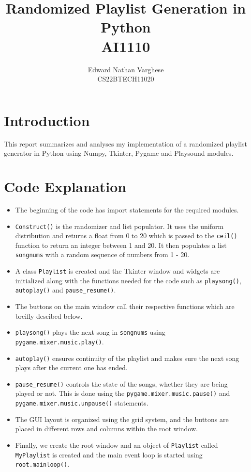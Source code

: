 \documentclass[journal,12pt,twocolumn]{IEEEtran}
\begin{document}
\vspace{3cm}

\title{Randomized Playlist Generation in Python \\ AI1110}
\author{Edward Nathan Varghese \\ CS22BTECH11020}


\maketitle

\section{Introduction}
This report summarizes and analyses my implementation of a randomized playlist generator in Python using Numpy, Tkinter, Pygame and Playsound modules.

\section{Code Explanation}
\begin{itemize}
  \item The beginning of the code has import statements for the required modules.
  \item \texttt{Construct()} is the randomizer and list populator. It uses the uniform distribution and returns a float from 0 to 20 which is passed to the \texttt{ceil()} function to return an integer between 1 and 20. It then populates a list \texttt{songnums} with a random sequence of numbers from 1 - 20.
  \item A class \texttt{Playlist} is created and the Tkinter window and widgets are initialized along with the functions needed for the code  such as \texttt{playsong()}, \texttt{autoplay()} and \texttt{pause\_resume()}.
  \item The buttons on the main window call their respective functions which are breifly descibed below.
  \item \texttt{playsong()} plays the next song in \texttt{songnums} using \texttt{pygame.mixer.music.play()}.
  \item \texttt{autoplay()} ensures continuity of the playlist and makes sure the next song plays after the current one has ended.
  \item \texttt{pause\_resume()} controls the state of the songs, whether they are being played or not. This is done using the \texttt{pygame.mixer.music.pause()} and \texttt{pygame.mixer.music.unpause()} statements.
  \item The GUI layout is organized using the grid system, and the buttons are placed in different rows and columns within the root window.
  \item Finally, we create the root window and an object of \texttt{Playlist} called \texttt{MyPlaylist} is created and the main event loop is started using \texttt{root.mainloop()}.
\end{itemize}
\end{document}
